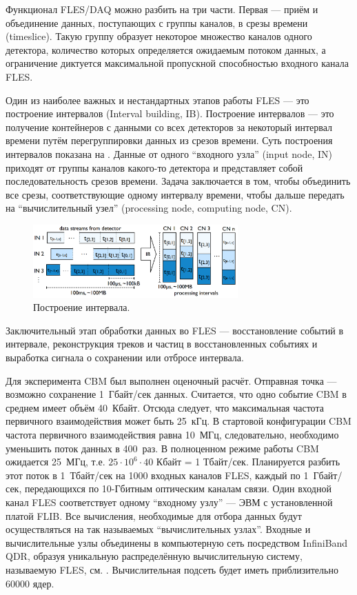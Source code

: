 Функционал FLES/DAQ можно разбить на три части. Первая --- приём и объединение данных, поступающих с группы каналов, в срезы времени (timeslice). Такую группу образует некоторое множество каналов одного детектора, количество которых определяется ожидаемым потоком данных, а ограничение диктуется максимальной пропускной способностью входного канала FLES.

Один из наиболее важных и нестандартных этапов работы FLES --- это построение интервалов (Interval building, IB). Построение интервалов --- это получение контейнеров с данными со всех детекторов за некоторый интервал времени путём перегруппировки данных из срезов времени. Суть построения интервалов показана на . Данные от одного ``входного узла'' (input node, IN) приходят от группы каналов какого-то детектора и представляет собой последовательность срезов времени. Задача заключается в том, чтобы объединить все срезы, соответствующие одному интервалу времени, чтобы дальше передать на ``вычислительный узел'' (processing node, computing node, CN).

\begin{figure}[H]
\centering
\includegraphics[width=0.7\textwidth]{pictures/Interval_building.png}
\caption{Построение интервала.}
\label{fig:IntervalBuilding}
\end{figure}

Заключительный этап обработки данных во FLES --- восстановление событий в интервале, реконструкция треков и частиц в восстановленных событиях и выработка сигнала о сохранении или отбросе интервала.

Для эксперимента CBM был выполнен оценочный расчёт. Отправная точка --- возможно сохранение 1~Гбайт/сек данных. Считается, что одно событие CBM в среднем имеет объём 40~Кбайт. Отсюда следует, что максимальная частота первичного взаимодействия может быть 25~кГц. В стартовой конфигурации CBM частота первичного взаимодействия равна 10~МГц, следовательно, необходимо уменьшить поток данных в 400~раз. В полноценном режиме работы CBM ожидается 25~МГц, т.е. $ 25 \cdot 10^{6} \cdot 40 $ Кбайт = 1 Тбайт/сек. Планируется разбить этот поток в 1~Тбайт/сек на 1000 входных каналов FLES, каждый по 1~Гбайт/сек, передающихся по 10-Гбитным оптическим каналам связи. Один входной канал FLES соответствует одному ``входному узлу'' --- ЭВМ с установленной платой FLIB. Все вычисления, необходимые для отбора данных будут осуществляться на так называемых ``вычислительных узлах''. Входные и вычислительные узлы объединены в компьютерную сеть посредством InfiniBand QDR, образуя уникальную распределённую вычислительную систему, называемую FLES, см. . Вычислительная подсеть будет иметь приблизительно 60000 ядер.

